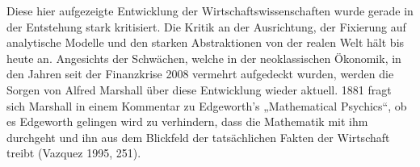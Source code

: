 \documentclass[
  nswissgerman,
  a4paper,
  DIV=11,
  numbers=noendperiod,
  oneside,
  openany]{scrreprt}
\begin{document}
\begin{tcolorbox}
Diese hier aufgezeigte Entwicklung der Wirtschaftswissenschaften wurde
gerade in der Entstehung stark kritisiert. Die Kritik an der
Ausrichtung, der Fixierung auf analytische Modelle und den starken
Abstraktionen von der realen Welt hält bis heute an. Angesichts der
Schwächen, welche in der neoklassischen Ökonomik, in den Jahren seit der
Finanzkrise 2008 vermehrt aufgedeckt wurden, werden die Sorgen von
Alfred Marshall über diese Entwicklung wieder aktuell. 1881 fragt sich
Marshall in einem Kommentar zu Edgeworth's „Mathematical Psychics``, ob
es Edgeworth gelingen wird zu verhindern, dass die Mathematik mit ihm
durchgeht und ihn aus dem Blickfeld der tatsächlichen Fakten der
Wirtschaft treibt (Vazquez 1995, 251).

\end{tcolorbox}

\end{document}
